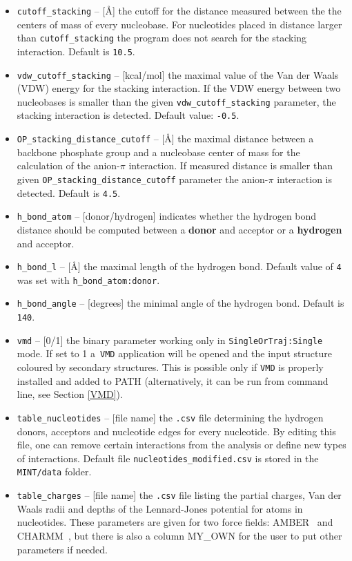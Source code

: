 \documentclass[12pt]{article}
\begin{document}
\begin{itemize}
\item {\tt cutoff\_stacking} -- [\AA] the cutoff for the distance  measured between the the centers of mass of every nucleobase. For nucleotides placed in distance larger than {\tt cutoff\_stacking} the program does not search for the stacking interaction. Default is {\tt 10.5}.
\item {\tt vdw\_cutoff\_stacking} --  [kcal/mol] the maximal value of the Van der Waals (VDW) energy for the stacking interaction. If the VDW energy between two nucleobases is smaller than the given {\tt vdw\_cutoff\_stacking} parameter, the stacking interaction is detected. Default value: {\tt -0.5}.
\item {\tt OP\_stacking\_distance\_cutoff} -- [\AA]  the maximal distance between a backbone phosphate group and a nucleobase center of mass for the calculation of the anion-$\pi$ interaction. If measured distance is smaller than given {\tt OP\_stacking\_distance\_cutoff} parameter the anion-$\pi$ interaction is detected. Default is {\tt 4.5}.
\item {\tt h\_bond\_atom} -- [donor/hydrogen] indicates whether the hydrogen bond distance should be computed between a {\bf donor} and acceptor or a {\bf hydrogen} and acceptor.
\item {\tt h\_bond\_l} -- [\AA] the maximal length  of the hydrogen bond. Default value of {\tt 4} was set with {\tt h\_bond\_atom:donor}.
\item {\tt h\_bond\_angle}  -- [degrees] the minimal angle of the hydrogen bond. Default is {\tt 140}.
\item {\tt vmd} -- [0/1] the binary parameter working only in {\tt SingleOrTraj:Single} mode. If set to 1 a~{\tt VMD} application will be opened and the input structure coloured by secondary structures. This is possible only if {\tt VMD} is properly installed and added to PATH (alternatively, it can be run from command line, see Section \ref{VMD}).
\item {\tt table\_nucleotides} -- [file name] the {\tt .csv} file determining the hydrogen donors, acceptors and nucleotide edges for every nucleotide. By editing this file, one can remove certain interactions from the analysis or define new types of interactions. Default file {\tt nucleotides\_modified.csv} is stored in the {\tt MINT/data} folder.
\item {\tt table\_charges}  -- [file name] the {\tt .csv} file listing the partial charges, Van der Waals radii and depths of the Lennard-Jones potential for atoms in nucleotides. These parameters are given for two force fields: AMBER~\cite{Wang2000} and CHARMM~\cite{Mackerell2000,Foloppe2000}, but there is also a column MY\_OWN for the user to put other parameters if needed. 

\end{itemize}
\end{document}
